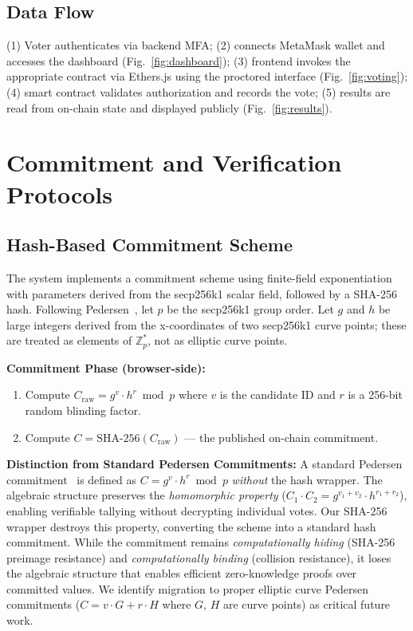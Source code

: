 \documentclass[conference]{IEEEtran}
\begin{document}
\subsection{Data Flow}
(1) Voter authenticates via backend MFA; (2) connects MetaMask wallet and accesses the dashboard (Fig.~\ref{fig:dashboard}); (3) frontend invokes the appropriate contract via Ethers.js using the proctored interface (Fig.~\ref{fig:voting}); (4) smart contract validates authorization and records the vote; (5) results are read from on-chain state and displayed publicly (Fig.~\ref{fig:results}).

\section{Commitment and Verification Protocols}

\subsection{Hash-Based Commitment Scheme}

The system implements a commitment scheme using finite-field exponentiation with parameters derived from the secp256k1 scalar field, followed by a SHA-256 hash. Following Pedersen~\cite{pedersen1991}, let $p$ be the secp256k1 group order. Let $g$ and $h$ be large integers derived from the x-coordinates of two secp256k1 curve points; these are treated as elements of $\mathbb{Z}_p^*$, not as elliptic curve points.

\textbf{Commitment Phase (browser-side):}
\begin{enumerate}[leftmargin=*]
    \item Compute $C_{\text{raw}} = g^v \cdot h^r \bmod p$ where $v$ is the candidate ID and $r$ is a 256-bit random blinding factor.
    \item Compute $C = \text{SHA-256}(C_{\text{raw}})$ --- the published on-chain commitment.
\end{enumerate}

\textbf{Distinction from Standard Pedersen Commitments:} A standard Pedersen commitment~\cite{pedersen1991} is defined as $C = g^v \cdot h^r \bmod p$ \emph{without} the hash wrapper. The algebraic structure preserves the \emph{homomorphic property} ($C_1 \cdot C_2 = g^{v_1+v_2} \cdot h^{r_1+r_2}$), enabling verifiable tallying without decrypting individual votes. Our SHA-256 wrapper destroys this property, converting the scheme into a standard hash commitment. While the commitment remains \emph{computationally hiding} (SHA-256 preimage resistance) and \emph{computationally binding} (collision resistance), it loses the algebraic structure that enables efficient zero-knowledge proofs over committed values. We identify migration to proper elliptic curve Pedersen commitments ($C = v \cdot G + r \cdot H$ where $G$, $H$ are curve points) as critical future work.
\end{document}
